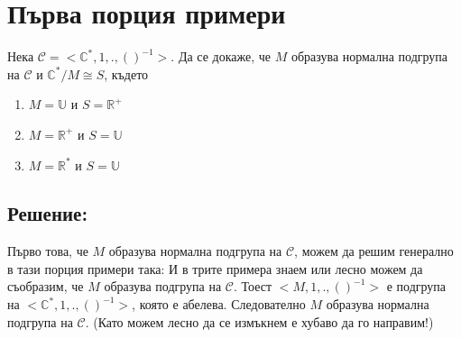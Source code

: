 \documentclass[12pt]{article}
\begin{document}
\section{Първа порция примери}
Нека \(\mathcal{C} = <\mathbb{C}^*, 1, ., ()^{-1}>\).
Да се докаже, че \(M\) образува нормална подгрупа на \(\mathcal{C}\) и 
\(\mathbb{C}^* / M \cong S\), където 
\begin{enumerate}[label=\alph*)]
    \item \(M = \mathbb{U}\) и \(S = \mathbb{R}^+\)
    \item \(M = \mathbb{R}^+\) и \(S = \mathbb{U}\)
    \item \(M = \mathbb{R}^*\) и \(S = \mathbb{U}\)
\end{enumerate}
\subsection{Решение:}
Първо това, че \(M\) образува нормална подгрупа на \(\mathcal{C}\),
можем да решим генерално в тази порция примери така:
И в трите примера знаем или лесно можем да съобразим, че \(M\) образува подгрупа на \(\mathcal{C}\). Тоест \(<M, 1, ., ()^{-1}>\) е подгрупа на \(<\mathbb{C}^*, 1, ., ()^{-1}>\), която е абелева. Следователно \(M\) образува нормална подгрупа на \(\mathcal{C}\). (Като можем лесно да се измъкнем е хубаво да го направим!)
\end{document}
